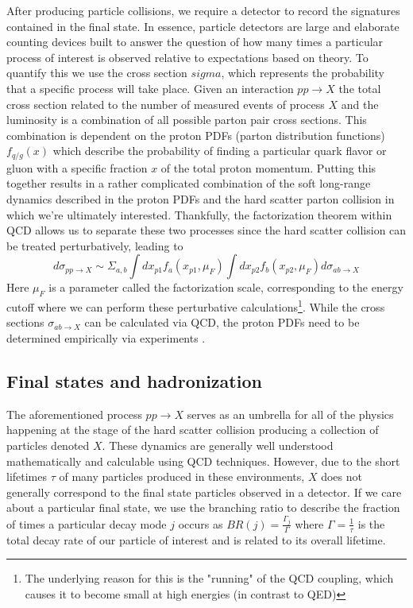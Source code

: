 After producing particle collisions, we require a detector to record the signatures contained in the final state.
In essence, particle detectors are large and elaborate counting devices built to answer the question of how many 
times a particular process of interest is observed relative to expectations based on theory. To quantify this we 
use the cross section $sigma$, which represents the probability that a specific process will take place. Given an 
interaction $pp \rightarrow X$ the total cross section related to the number of measured events of process $X$ 
and the luminosity is a combination of all possible parton pair cross sections. This combination is dependent on 
the proton PDFs (parton distribution functions) $f_{q/g}(x)$ which describe the probability of finding a 
particular quark flavor or gluon with a specific fraction $x$ of the total proton momentum. Putting this together 
results in a rather complicated combination of the soft long-range dynamics described in the proton PDFs and 
the hard scatter parton collision in which we're ultimately interested. Thankfully, the factorization theorem within 
QCD \cite{collins-qcd-factorization} allows us to separate these two processes since the hard scatter collision 
can be treated perturbatively, leading to 
\begin{equation}
d\sigma_{pp \rightarrow X} \sim 
\Sigma_{a,b} \int dx_{p1} f_{a}(x_{p1}, \mu_F) \int dx_{p2} f_{b}(x_{p2}, \mu_F) d\sigma_{ab \rightarrow X}
\label{eqn:parton-cross-section}
\end{equation}
Here $\mu_F$ is a parameter called the factorization scale, corresponding to the energy cutoff where we can 
perform these perturbative calculations\footnote{The underlying reason for this is the "running" of the QCD 
coupling, which causes it to become small at high energies (in contrast to QED)}. While the cross sections 
$\sigma_{ab \rightarrow X}$ can be calculated via QCD, the proton PDFs need to be determined empirically via 
experiments \cite{bailey-proton-pdfs}.

\subsection{Final states and hadronization}

The aforementioned process $pp \rightarrow X$ serves as an umbrella for all of the physics happening at the 
stage of the hard scatter collision producing a collection of particles denoted $X$. These dynamics are generally 
well understood mathematically and calculable using QCD techniques. However, due to the short lifetimes $\tau$ 
of many particles produced in these environments, $X$ does not generally correspond to the final state particles 
observed in a detector. If we care about a particular final state, we use the branching ratio to describe the fraction 
of times a particular decay mode $j$ occurs as $BR(j) = \frac{\Gamma_j}{\Gamma}$ where 
$\Gamma = \frac{1}{\tau}$ is the total decay rate of our particle of interest and is related to its overall lifetime. \par

